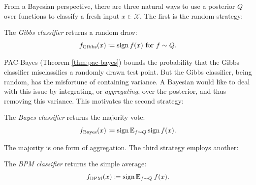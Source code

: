 \begin{refsection}
From a Bayesian perspective, there are three natural ways to use a posterior $Q$ over functions to classify a fresh input $x\in\mathcal{X}$. The first is the random strategy:
\begin{definition}
The \textit{Gibbs classifier} returns a random draw:
    \begin{equation}
        f_\mathrm{Gibbs}(x) \coloneqq \operatorname{sign} f(x)  \text{ for } f\sim Q.
    \end{equation}
\end{definition}
PAC-Bayes (Theorem \ref{thm:pac-bayes}) bounds the probability that the Gibbs classifier misclassifies a randomly drawn test point. But the Gibbs classifier, being random, has the misfortune of containing variance. A Bayesian would like to deal with this issue by integrating, or \textit{aggregating}, over the posterior, and thus removing this variance. This motivates the second strategy:
\begin{definition}
The \textit{Bayes classifier} returns the majority vote:
    \begin{equation}
        f_\mathrm{Bayes}(x) \coloneqq \operatorname{sign} \operatorname{\mathbb{E}}_{f\sim Q} \operatorname{sign} f(x).
    \end{equation}
\end{definition}
The majority is one form of aggregation. The third strategy employs another:
\begin{definition}
    The \textit{BPM classifier} returns the simple average:
        \begin{equation}
            f_\mathrm{BPM}(x) \coloneqq \operatorname{sign} \operatorname{\mathbb{E}}_{f\sim Q} f(x).
        \end{equation}
\end{definition}


\end{refsection}
